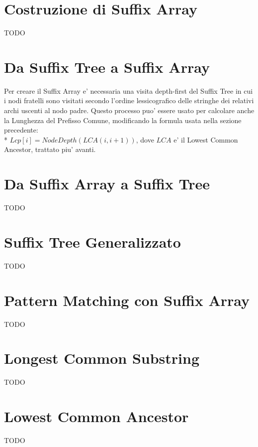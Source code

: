 \section{Costruzione di Suffix Array}

TODO

\section{Da Suffix Tree a Suffix Array}

Per creare il Suffix Array e' necessaria una visita depth-first del Suffix Tree in cui i nodi fratelli sono visitati secondo l'ordine lessicografico delle stringhe dei relativi archi uscenti al nodo padre.
Questo processo puo' essere usato per calcolare anche la Lunghezza del Prefisso Comune, modificando la formula usata nella sezione precedente: \\*
$Lcp[i] = NodeDepth(LCA(i, i+1))$, dove $LCA$ e' il Lowest Common Ancestor, trattato piu' avanti.

\section{Da Suffix Array a Suffix Tree}

TODO

\section{Suffix Tree Generalizzato}

TODO

\section{Pattern Matching con Suffix Array}

TODO

\section{Longest Common Substring}

TODO

\section{Lowest Common Ancestor}

TODO